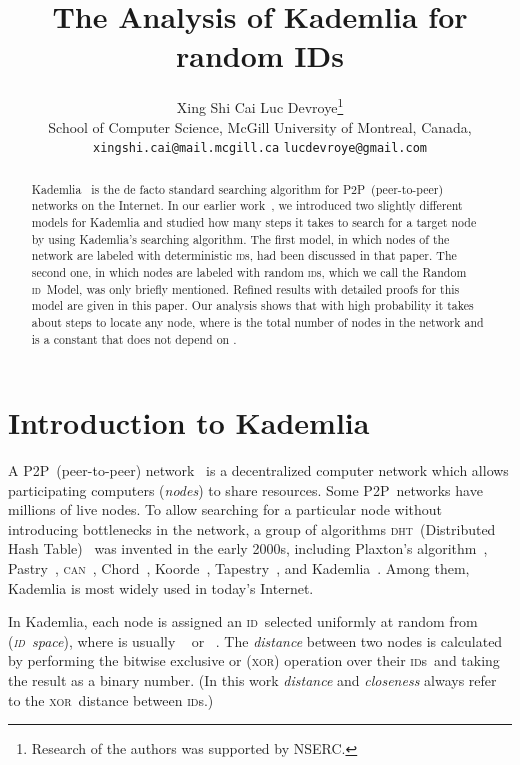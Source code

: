 \documentclass{article}
\title{The Analysis of Kademlia for random IDs}
\author{
    Xing Shi Cai \hspace{8 mm} Luc Devroye\thanks{Research of the authors was supported
    by NSERC.}\\
    \small School of Computer Science, McGill University of Montreal, Canada,\\
    \small \texttt{xingshi.cai@mail.mcgill.ca} \hspace{8 mm} \texttt{lucdevroye@gmail.com}
}
\newcommand{\dht}{{\scshape dht}}
\newcommand{\id}{{\scshape id}}
\newcommand{\ids}{{\id s}}
\newcommand{\xor}{{\scshape xor}}
\newcommand{\ptwop}{{P2P}}
\begin{document}
\maketitle

\begin{abstract}
Kademlia~\citep{Maymounkov02} is the de facto standard searching algorithm for
\ptwop\ (peer-to-peer) networks on the Internet.  In our earlier
work~\citep{Cai2013}, we introduced two slightly different models for Kademlia
and studied how many steps it takes to search for a target node by using
Kademlia's searching algorithm. The first model, in which nodes of the network
are labeled with deterministic \ids, had been discussed in that paper.  The
second one, in which nodes are labeled with random \ids, which we call the
Random \id\ Model, was only briefly mentioned.  Refined results with detailed
proofs for this model are given in this paper. Our analysis shows that with
high probability it takes about  steps to locate any node, where 
is the total number of nodes in the network and  is a constant that does not
depend on .
\end{abstract}

\section{Introduction to Kademlia}

A \ptwop\ (peer-to-peer) network~\citep{Schollmeier2001} is a decentralized
computer network which allows participating computers (\emph{nodes}) to share
resources.  Some \ptwop\ networks have millions of live nodes.  To allow
searching for a particular node without introducing bottlenecks in the network,
a group of algorithms  \dht\ (Distributed Hash Table)~\citep{Balakrishnan03}
was invented in the early 2000s, including Plaxton's
algorithm~\citep{Plaxton1999accessing}, Pastry~\citep{Rowstron01}, {\scshape
can}~\citep{Ratnasamy2001}, Chord~\citep{Stoica2001},
Koorde~\citep{Kaashoek2003koorde}, Tapestry~\citep{Zhao04}, and
Kademlia~\citep{Maymounkov02}. Among them, Kademlia is most widely used in
today's Internet.

In Kademlia, each node is assigned an \id\ selected uniformly at random from
 (\emph{\id\ space}), where  is usually ~\citep{Steiner07} or
~\citep{Crosby07}. The \emph{distance} between two nodes is calculated by
performing the bitwise exclusive or (\xor) operation over their \ids\ and taking the result
as a binary number. (In this work \emph{distance} and \emph{closeness} always
refer to the \xor\ distance between \ids.) 
\end{document}
